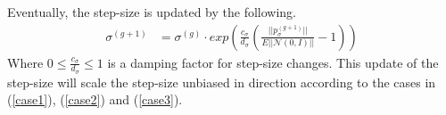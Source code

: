 Eventually, the step-size is updated by the following.
\begin{align}
\sigma^{(g+1)} &= \sigma^{(g)} \cdot exp \left( \frac{c_{\sigma}}{d_{\sigma}} \left( \frac{||p_\sigma^{(g+1)}||}{E|| \mathcal{N}(0, I) ||} - 1 \right) \right)
\end{align}
Where $0 \leq \frac{c_\sigma}{d_\sigma} \leq 1$ is a damping factor for step-size changes.
This update of the step-size will scale the step-size unbiased in direction 
according to the cases in 
(\ref{case1}), (\ref{case2}) and (\ref{case3}).









